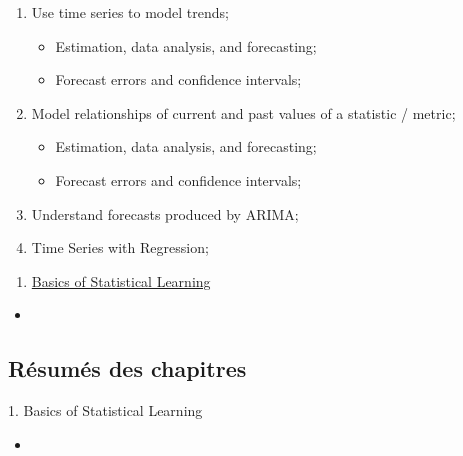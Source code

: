 \documentclass[12pt, titlepage, french]{report}
\begin{document}
\begin{outcomes}
\begin{enumerate}
	\item	Use time series to model trends;
		\begin{itemize}
		\item	Estimation, data analysis, and forecasting;
		\item	Forecast errors and confidence intervals;
		\end{itemize}
\tcbline
	\item	Model relationships of current and past values of a statistic / metric;
		\begin{itemize}
		\item	Estimation, data analysis, and forecasting;
		\item	Forecast errors and confidence intervals;
		\end{itemize}
\tcbline
	\item	Understand forecasts produced by ARIMA;
\tcbline
	\item	Time Series with Regression;
\end{enumerate}
\end{outcomes}

\begin{ASM_chapter}
\begin{enumerate}
	\item	\hyperref[BASICS]{Basics of Statistical Learning}
\end{enumerate}
\end{ASM_chapter}

\begin{YTB_vids}
\begin{itemize}
	\item	
\end{itemize}
\end{YTB_vids}

\subsection{Résumés des chapitres}

\begin{CHPT_SUMM}[label = {BASICS}]{1. Basics of Statistical Learning}
	\begin{itemize}
		\item	
	\end{itemize}
\end{CHPT_SUMM}
\end{document}
